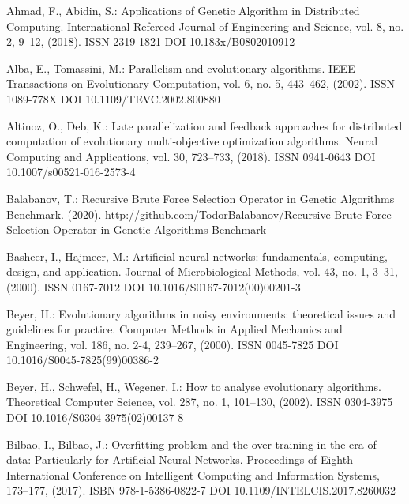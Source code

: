 
\begin{thebibliography}{99.}

 Ahmad, F., Abidin, S.: Applications of Genetic Algorithm in Distributed Computing. International Refereed Journal of Engineering and Science, vol. 8, no. 2, 9--12, (2018). ISSN 2319-1821 DOI 10.183x/B0802010912

 Alba, E., Tomassini, M.: Parallelism and evolutionary algorithms. IEEE Transactions on Evolutionary Computation, vol. 6, no. 5, 443--462, (2002). ISSN 1089-778X DOI 10.1109/TEVC.2002.800880

 Altinoz, O., Deb, K.: Late parallelization and feedback approaches for distributed computation of evolutionary multi-objective optimization algorithms. Neural Computing and Applications, vol. 30, 723--733, (2018). ISSN 0941-0643 DOI 10.1007/s00521-016-2573-4

 Balabanov, T.: Recursive Brute Force Selection Operator in Genetic Algorithms Benchmark. (2020). http://github.com/TodorBalabanov/Recursive-Brute-Force-Selection-Operator-in-Genetic-Algorithms-Benchmark

 Basheer, I., Hajmeer, M.: Artificial neural networks: fundamentals, computing, design, and application. Journal of Microbiological Methods, vol. 43, no. 1, 3--31, (2000). ISSN 0167-7012 DOI 10.1016/S0167-7012(00)00201-3

 Beyer, H.: Evolutionary algorithms in noisy environments: theoretical issues and guidelines for practice. Computer Methods in Applied Mechanics and Engineering, vol. 186, no. 2-4, 239--267, (2000). ISSN 0045-7825 DOI 10.1016/S0045-7825(99)00386-2

 Beyer, H., Schwefel, H., Wegener, I.: How to analyse evolutionary algorithms. Theoretical Computer Science, vol. 287, no. 1, 101--130, (2002). ISSN 0304-3975 DOI 10.1016/S0304-3975(02)00137-8

 Bilbao, I., Bilbao, J.: Overfitting problem and the over-training in the era of data: Particularly for Artificial Neural Networks. Proceedings of Eighth International Conference on Intelligent Computing and Information Systems, 173--177, (2017). ISBN 978-1-5386-0822-7 DOI 10.1109/INTELCIS.2017.8260032


\end{thebibliography}
